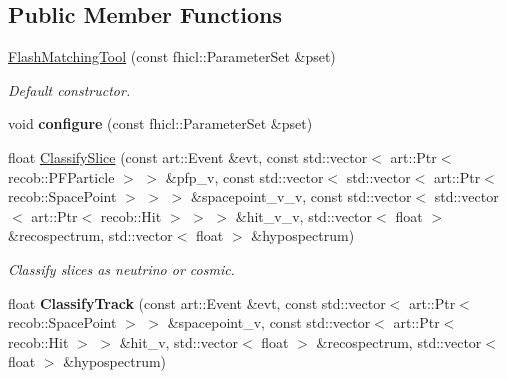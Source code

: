 \subsection*{Public Member Functions}
\begin{DoxyCompactItemize}
\item 
\hyperlink{classflashmatch_1_1FlashMatchingTool_a8c6b08ba5404a69ad5fc984eaf8a1eba}{Flash\-Matching\-Tool} (const fhicl\-::\-Parameter\-Set \&pset)
\begin{DoxyCompactList}\small\item\em Default constructor. \end{DoxyCompactList}\item 
\hypertarget{classflashmatch_1_1FlashMatchingTool_a58e2b1ea201c0b8429e1111380b0a108}{void {\bfseries configure} (const fhicl\-::\-Parameter\-Set \&pset)}\label{classflashmatch_1_1FlashMatchingTool_a58e2b1ea201c0b8429e1111380b0a108}

\item 
float \hyperlink{classflashmatch_1_1FlashMatchingTool_aed79e484b39c5d02e84714b45c68bf7f}{Classify\-Slice} (const art\-::\-Event \&evt, const std\-::vector$<$ art\-::\-Ptr$<$ recob\-::\-P\-F\-Particle $>$ $>$ \&pfp\-\_\-v, const std\-::vector$<$ std\-::vector$<$ art\-::\-Ptr$<$ recob\-::\-Space\-Point $>$ $>$ $>$ \&spacepoint\-\_\-v\-\_\-v, const std\-::vector$<$ std\-::vector$<$ art\-::\-Ptr$<$ recob\-::\-Hit $>$ $>$ $>$ \&hit\-\_\-v\-\_\-v, std\-::vector$<$ float $>$ \&recospectrum, std\-::vector$<$ float $>$ \&hypospectrum)
\begin{DoxyCompactList}\small\item\em Classify slices as neutrino or cosmic. \end{DoxyCompactList}\item 
\hypertarget{classflashmatch_1_1FlashMatchingTool_a576990a409d28ed7526963195df7e55a}{float {\bfseries Classify\-Track} (const art\-::\-Event \&evt, const std\-::vector$<$ art\-::\-Ptr$<$ recob\-::\-Space\-Point $>$ $>$ \&spacepoint\-\_\-v, const std\-::vector$<$ art\-::\-Ptr$<$ recob\-::\-Hit $>$ $>$ \&hit\-\_\-v, std\-::vector$<$ float $>$ \&recospectrum, std\-::vector$<$ float $>$ \&hypospectrum)}\label{classflashmatch_1_1FlashMatchingTool_a576990a409d28ed7526963195df7e55a}

\end{DoxyCompactItemize}
